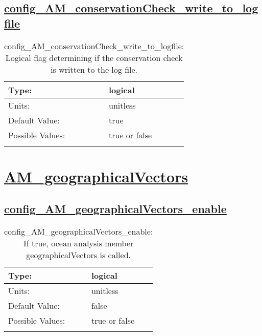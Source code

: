 \subsection[config\_AM\_conservationCheck\_write\_to\_logfile]{\hyperref[sec:nm_tab_AM_conservationCheck]{config\_AM\_conservationCheck\_write\_to\_logfile}}
\label{subsec:nm_sec_config_AM_conservationCheck_write_to_logfile}
\begin{center}
\begin{longtable}{| p{2.0in} || p{4.0in} |}
    \hline
    Type: & logical \\
    \hline
    Units: & \si{unitless} \\
    \hline
    Default Value: & true \\
    \hline
    Possible Values: & true or false \\
    \hline
    \caption{config\_AM\_conservationCheck\_write\_to\_logfile: Logical flag determining if the conservation check is written to the log file.}
\end{longtable}
\end{center}
\section[AM\_geographicalVectors]{\hyperref[sec:nm_tab_AM_geographicalVectors]{AM\_geographicalVectors}}
\label{sec:nm_sec_AM_geographicalVectors}
\subsection[config\_AM\_geographicalVectors\_enable]{\hyperref[sec:nm_tab_AM_geographicalVectors]{config\_AM\_geographicalVectors\_enable}}
\label{subsec:nm_sec_config_AM_geographicalVectors_enable}
\begin{center}
\begin{longtable}{| p{2.0in} || p{4.0in} |}
    \hline
    Type: & logical \\
    \hline
    Units: & \si{unitless} \\
    \hline
    Default Value: & false \\
    \hline
    Possible Values: & true or false \\
    \hline
    \caption{config\_AM\_geographicalVectors\_enable: If true, ocean analysis member geographicalVectors is called.}
\end{longtable}
\end{center}
